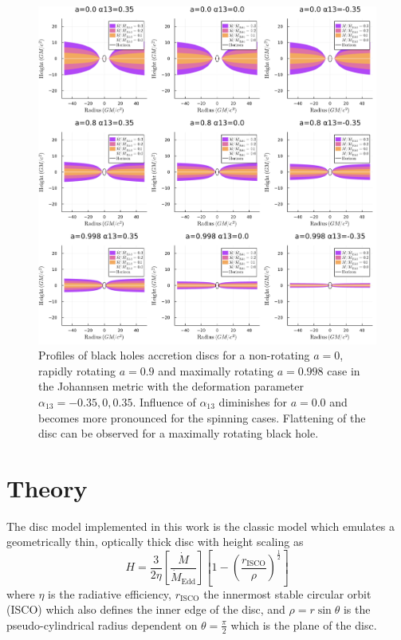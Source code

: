 \documentclass[fleqn,usenatbib,useAMS]{mnras}
\begin{document}
\begin{figure}
    \centering
    \includegraphics[width=0.98\linewidth]{figures/abdikamalov20.png}
    \caption{Profiles of black holes accretion discs for a non-rotating $a = 0$, rapidly rotating $a = 0.9$ and maximally rotating $a = 0.998$ case in the Johannsen metric with the deformation parameter $\alpha_{13} = -0.35, 0, 0.35$. Influence of $\alpha_{13}$ diminishes for $a = 0.0$ and becomes more pronounced for the spinning cases. Flattening of the disc can be observed for a maximally rotating black hole.}
    \label{eddingtonratio}
\end{figure}

\section{Theory}
The disc model implemented in this work is the classic \cite{shakura1973black} model which emulates a geometrically thin, optically thick disc with height scaling as
%
\begin{equation}
    H=\frac{3}{2\eta} \left[\frac{\dot{M}}{\dot{M}_\text{Edd}}\right]\left [1-\left(\frac{r_\text{ISCO}}{\rho}\right)^\frac{1}{2}\right]
    \label{height}
\end{equation}
%
where $\eta$ is the radiative efficiency, $r_\text{ISCO}$ the innermost stable circular orbit (ISCO) which also defines the inner edge of the disc, and $\rho = r \sin\theta$ is the pseudo-cylindrical radius dependent on $\theta = \frac{\pi}{2}$ which is the plane of the disc. 
\end{document}
